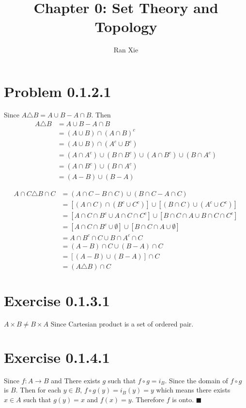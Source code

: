 \documentclass[12pt]{article}
\title{Chapter 0: Set Theory and Topology}
\author{Ran Xie}
\begin{document}
\maketitle
	
\section*{Problem 0.1.2.1}
Since $A \triangle B = A \cup B - A \cap B$. Then 
$$ \begin{aligned}
	A \triangle B &= A \cup B - A \cap B \\
	&= (A \cup B) \cap (A \cap B)^c \\
	&= (A \cup B) \cap (A^c \cup B^c) \\
	&= (A \cap A^c) \cup (B \cap B^c) \cup (A \cap B^c) \cup (B \cap A^c) \\
	&= (A \cap B^c) \cup (B \cap A^c) \\
	&= (A - B) \cup (B - A)
\end{aligned}
$$

$$ \begin{aligned}
	A \cap C \triangle B \cap C &= (A \cap C - B \cap C) \cup (B \cap C - A \cap C) \\
	&= [(A\cap C) \cap (B^c \cup C^c)] \cup [ (B \cap C) \cup (A^c \cup C^c)] \\
	&= [A \cap C \cap B^c \cup A \cap C \cap C^c ] \cup [ B \cap C \cap A \cup B \cap C \cap C^c] \\
	&= [A \cap C \cap B^c \cup \emptyset ] \cup [ B \cap C \cap A \cup \emptyset] \\
	&=  A \cap B^c \cap C \cup  B \cap A^c \cap C  \\
	&= (A-B)\cap C  \cup (B - A) \cap C \\
	&=  [(A - B) \cup (B-A)] \cap C \\
	&= 	(A \triangle B) \cap C   
\end{aligned}
$$
\section*{Exercise 0.1.3.1}
$A \times B \neq B \times A$ Since Cartesian product is a set of ordered pair. 

\section*{Exercise 0.1.4.1}
Since $f : A \rightarrow B$ and There exists $g$ such that $f \circ g = i_B$.  Since the domain of $f \circ g$ is $B$. Then for each $y \in B$, $f \circ g(y) = i_B(y) = y$ which means there exists $x \in A$ such that $g(y) = x$ and $f(x) = y$. Therefore $f$ is onto.  $\blacksquare$
\end{document}
